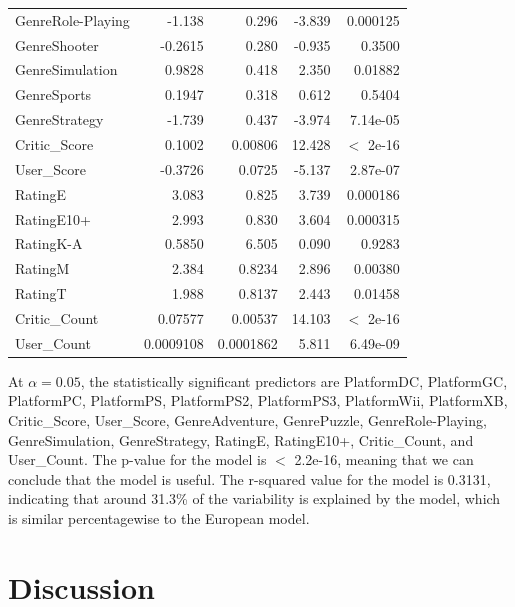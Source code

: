 \documentclass[12pt]{article}
\begin{document}
\begin{table}[ht]
\begin{tabular}{lrrrr}
    GenreRole-Playing & -1.138 & 0.296 & -3.839 & 0.000125 \\
    GenreShooter & -0.2615 & 0.280 & -0.935 & 0.3500 \\
    GenreSimulation & 0.9828 & 0.418 & 2.350 & 0.01882 \\
    GenreSports & 0.1947 & 0.318 & 0.612 & 0.5404 \\
    GenreStrategy & -1.739 & 0.437 & -3.974 & 7.14e-05 \\
    Critic\_Score & 0.1002 & 0.00806 & 12.428 & $<$ 2e-16 \\
    User\_Score & -0.3726 & 0.0725 & -5.137 & 2.87e-07 \\
    RatingE & 3.083 & 0.825 & 3.739 & 0.000186 \\
    RatingE10+ & 2.993 & 0.830 & 3.604 & 0.000315 \\
    RatingK-A & 0.5850 & 6.505 & 0.090 & 0.9283 \\
    RatingM & 2.384 & 0.8234 & 2.896 & 0.00380 \\
    RatingT & 1.988 & 0.8137 & 2.443 & 0.01458 \\
    Critic\_Count & 0.07577 & 0.00537 & 14.103 & $<$ 2e-16 \\
    User\_Count & 0.0009108 & 0.0001862 & 5.811 & 6.49e-09 \\
    \hline
  \end{tabular}
\end{table}

At $\alpha=0.05$, the statistically significant predictors are PlatformDC, PlatformGC, PlatformPC, PlatformPS, PlatformPS2, 
PlatformPS3, PlatformWii, PlatformXB, Critic_Score, User_Score, GenreAdventure, GenrePuzzle, GenreRole-Playing, GenreSimulation, 
GenreStrategy, RatingE, RatingE10+, Critic_Count, and User_Count.
The p-value for the model is $<$ 2.2e-16, meaning that we can conclude that the model is useful. The r-squared value for the model is 0.3131,
indicating that around 31.3\% of the variability is explained by the model, which is similar percentagewise to the European model.



\section{Discussion}
\label{sec:disc}
\end{document}

